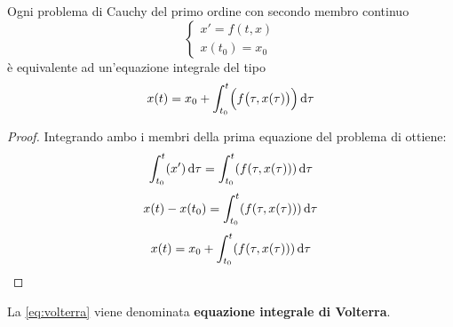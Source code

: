 \begin{proposition}
	Ogni problema di Cauchy del primo ordine con secondo membro continuo
	$$\begin{cases}x'=f(t,x)\\x(t_0)=x_0\end{cases}$$
	è equivalente ad un'equazione integrale del tipo
	\begin{equation}
		\label{eq:volterra}
		x(t)=x_0+\int_{t_0}^{t}\Bigl(f\bigl(\tau,x(\tau)\bigr)\Bigr)\,\mathrm{d}{\tau}
	\end{equation}
	\begin{proof}
		Integrando ambo i membri della prima equazione del problema di ottiene:
		$$\int_{t_0}^{t}( x')\,\mathrm{d}{\tau}=\int_{t_0}^{t}(f(\tau,x(\tau)))\,\mathrm{d}{\tau}$$
		$$x(t)-x(t_0)=\int_{t_0}^{t}(f(\tau,x(\tau)))\,\mathrm{d}{\tau}$$
		$$x(t)=x_0+\int_{t_0}^{t}(f(\tau,x(\tau)))\,\mathrm{d}{\tau}$$
	\end{proof}
\end{proposition}
\begin{definition}
	\label{def:equaz_volterra}
	La \cref{eq:volterra} viene denominata \textbf{equazione integrale di Volterra}.
\end{definition}

